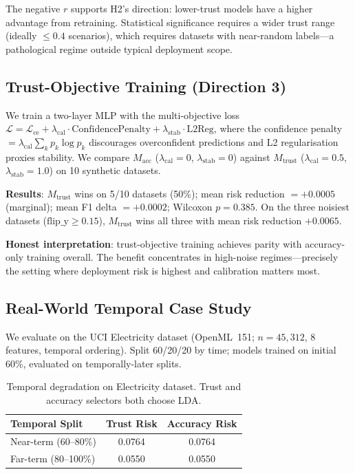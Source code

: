 \documentclass[10pt]{article}
\begin{document}
The negative $r$ supports H2's direction: lower-trust models have a higher advantage from retraining. Statistical significance requires a wider trust range (ideally $\leq 0.4$ scenarios), which requires datasets with near-random labels—a pathological regime outside typical deployment scope.

\subsection{Trust-Objective Training (Direction 3)}

We train a two-layer MLP with the multi-objective loss $\mathcal{L} = \mathcal{L}_\text{ce} + \lambda_\text{cal}\cdot\text{ConfidencePenalty} + \lambda_\text{stab}\cdot\text{L2Reg}$, where the confidence penalty $= \lambda_\text{cal}\sum_k p_k\log p_k$ discourages overconfident predictions \citep{pereyra2017regularizing} and L2 regularisation proxies stability. We compare $M_\text{acc}$ ($\lambda_\text{cal}{=}0$, $\lambda_\text{stab}{=}0$) against $M_\text{trust}$ ($\lambda_\text{cal}{=}0.5$, $\lambda_\text{stab}{=}1.0$) on 10 synthetic datasets.

\textbf{Results}: $M_\text{trust}$ wins on 5/10 datasets (50\%); mean risk reduction $= +0.0005$ (marginal); mean F1 delta $= +0.0002$; Wilcoxon $p{=}0.385$. On the three noisiest datasets ($\text{flip\_y} \geq 0.15$), $M_\text{trust}$ wins all three with mean risk reduction $+0.0065$.

\textbf{Honest interpretation}: trust-objective training achieves parity with accuracy-only training overall. The benefit concentrates in high-noise regimes—precisely the setting where deployment risk is highest and calibration matters most.

\subsection{Real-World Temporal Case Study}

We evaluate on the UCI Electricity dataset \citep{harries1999splice} (OpenML~151; $n{=}45{,}312$, 8 features, temporal ordering). Split 60/20/20 by time; models trained on initial 60\%, evaluated on temporally-later splits.

\begin{table}[h]
\centering
\caption{Temporal degradation on Electricity dataset. Trust and accuracy selectors both choose LDA.}
\label{tab:temporal}
\begin{tabular}{lcc}
\toprule
\textbf{Temporal Split} & \textbf{Trust Risk} & \textbf{Accuracy Risk} \\
\midrule
Near-term (60--80\%) & 0.0764 & 0.0764 \\
Far-term (80--100\%) & 0.0550 & 0.0550 \\
\bottomrule
\end{tabular}
\end{table}
\end{document}

